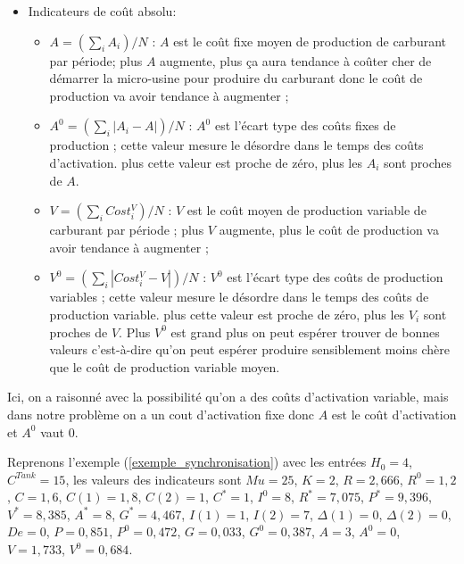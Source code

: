 \begin{itemize}[label=$\square$]
\item	Indicateurs de coût absolu:
 
\begin{itemize}
\item	$A = (\sum_i A_i)/N$ : $A$ est le coût fixe moyen de production de carburant par période; plus $A$ augmente, plus ça aura tendance à coûter cher de démarrer la micro-usine pour produire du carburant donc le coût de production va avoir tendance à augmenter ;  
\item $A^0 = (\sum_i |A_i- A|)/N$ : $A^0$ est l'écart type des coûts fixes de production ; cette valeur mesure le désordre dans le temps des coûts d'activation. plus cette valeur est proche de zéro, plus les $A_i$ sont proches de $A$. %
\item	$V = (\sum_i Cost_i^V)/N$ : $V$ est le coût moyen de production variable de carburant par période ;  plus $V$ augmente, plus le coût de production va avoir tendance à augmenter ;
\item $V^0 = (\sum_i |Cost_i^V- V|)/N$ :  $V^0$ est l'écart type des coûts de production variables ; cette valeur mesure le désordre dans le temps des coûts de production variable. plus cette valeur est proche de zéro, plus les $V_i$ sont proches de $V$. Plus $V^0$ est grand plus on peut espérer trouver de bonnes valeurs c'est-à-dire qu'on peut espérer produire sensiblement moins chère que le coût de production variable moyen.%
\end{itemize}
\end{itemize}
Ici, on a raisonné avec la possibilité qu'on a des coûts d'activation variable, mais dans notre problème on a un cout d'activation fixe donc $A$ est le coût d'activation et $A^0$ vaut 0.


\begin{Example}
	Reprenons l'exemple (\ref{exemple_synchronisation}) avec les entrées $H_0=4$, $C^{Tank}=15$, les valeurs des indicateurs sont $Mu = 25$, $K = 2$, $R=2,666$, $R^0=1,2$, $C=1,6$, $C(1)=1,8$, $C(2)=1$, $C^*=1$, $I^0 = 8$, $R^* =7,075$, $P^* =9,396$, $V^* =8,385$, $A^* =8$, $G^* =4,467$, $I(1) =1$, $I(2) =7$, $\Delta(1)=0$, $\Delta(2)=0$, $De=0$, $P=0,851$, $P^0=0,472$, $G=0,033$, $G^0=0,387$, $A=3$, $A^0=0$, $V=1,733$, $V^0=0,684$.
\end{Example}

